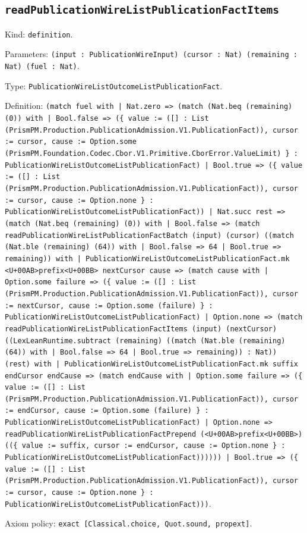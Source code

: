 \documentclass[11pt]{article}
\begin{document}
\subsection*{\texttt{readPublicationWireListPublicationFactItems}}
\noindent Kind: \texttt{definition}.\par
\noindent Parameters: \texttt{(input : PublicationWireInput) (cursor : Nat) (remaining : Nat) (fuel : Nat)}.\par
\noindent Type: \texttt{PublicationWireListOutcomeListPublicationFact}.\par
\noindent Definition: \texttt{(match fuel with | Nat.zero => (match (Nat.beq (remaining) (0)) with | Bool.false => (\{ value := ([] : List (PrismPM.Production.PublicationAdmission.V1.PublicationFact)), cursor := cursor, cause := Option.some (PrismPM.Foundation.Codec.Cbor.V1.Primitive.CborError.ValueLimit) \} : PublicationWireListOutcomeListPublicationFact) | Bool.true => (\{ value := ([] : List (PrismPM.Production.PublicationAdmission.V1.PublicationFact)), cursor := cursor, cause := Option.none \} : PublicationWireListOutcomeListPublicationFact)) | Nat.succ rest => (match (Nat.beq (remaining) (0)) with | Bool.false => (match readPublicationWireListPublicationFactBatch (input) (cursor) ((match (Nat.ble (remaining) (64)) with | Bool.false => 64 | Bool.true => remaining)) with | PublicationWireListOutcomeListPublicationFact.mk <U+00AB>prefix<U+00BB> nextCursor cause => (match cause with | Option.some failure => (\{ value := ([] : List (PrismPM.Production.PublicationAdmission.V1.PublicationFact)), cursor := nextCursor, cause := Option.some (failure) \} : PublicationWireListOutcomeListPublicationFact) | Option.none => (match readPublicationWireListPublicationFactItems (input) (nextCursor) ((LexLeanRuntime.subtract (remaining) ((match (Nat.ble (remaining) (64)) with | Bool.false => 64 | Bool.true => remaining)) : Nat)) (rest) with | PublicationWireListOutcomeListPublicationFact.mk suffix endCursor endCause => (match endCause with | Option.some failure => (\{ value := ([] : List (PrismPM.Production.PublicationAdmission.V1.PublicationFact)), cursor := endCursor, cause := Option.some (failure) \} : PublicationWireListOutcomeListPublicationFact) | Option.none => readPublicationWireListPublicationFactPrepend (<U+00AB>prefix<U+00BB>) ((\{ value := suffix, cursor := endCursor, cause := Option.none \} : PublicationWireListOutcomeListPublicationFact)))))) | Bool.true => (\{ value := ([] : List (PrismPM.Production.PublicationAdmission.V1.PublicationFact)), cursor := cursor, cause := Option.none \} : PublicationWireListOutcomeListPublicationFact)))}.\par
\noindent Axiom policy: \texttt{exact [Classical.choice, Quot.sound, propext]}.\par
\end{document}
